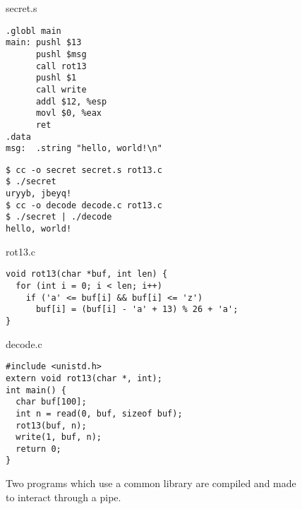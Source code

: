\begin{figure} %
  \centering
  \begin{minipage}{0.39\textwidth}
    \begin{center}
      secret.s
    \end{center}
    \vspace{-1.5em}
      \begin{verbatim}
.globl main
main: pushl $13
      pushl $msg
      call rot13
      pushl $1
      call write
      addl $12, %esp
      movl $0, %eax
      ret
.data
msg:  .string "hello, world!\n"
      \end{verbatim}
    \vspace{-1em}
      \begin{verbatim}
$ cc -o secret secret.s rot13.c
$ ./secret
uryyb, jbeyq!
$ cc -o decode decode.c rot13.c
$ ./secret | ./decode
hello, world!
  \end{verbatim}
  \end{minipage}
  \hspace{0.8em}
  \begin{minipage}{.57\textwidth}
    \begin{center}
      rot13.c
    \end{center}
    \vspace{-1.5em}
      \begin{verbatim}
void rot13(char *buf, int len) {
  for (int i = 0; i < len; i++)
    if ('a' <= buf[i] && buf[i] <= 'z')
      buf[i] = (buf[i] - 'a' + 13) % 26 + 'a';
}
      \end{verbatim}
    \vspace{0.4em}
    \begin{center}
      decode.c
    \end{center}
    \vspace{-1.5em}
      \begin{verbatim}
#include <unistd.h>
extern void rot13(char *, int);
int main() {
  char buf[100];
  int n = read(0, buf, sizeof buf);
  rot13(buf, n);
  write(1, buf, n);
  return 0;
}
      \end{verbatim}
  \end{minipage}
  \caption{Two programs which use a common library
    are compiled and made to
  interact through a pipe.}
  \label{fig:readwritehello}
\end{figure}